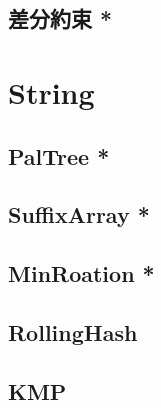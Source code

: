 \documentclass[a4paper,10pt,twocolumn,oneside]{article}
\begin{document}
% 

\subsection{差分約束 *}


%

% 

\section{String}

\subsection{PalTree *}


\subsection{SuffixArray *}


\subsection{MinRoation *}


\subsection{RollingHash}


\subsection{KMP}

\end{document}
